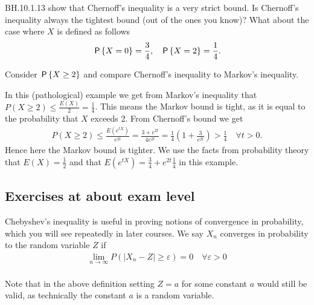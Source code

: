 \documentclass[assignments]{subfiles}
\begin{document}
\begin{exercise}
BH.10.1.13 show that Chernoff's inequality is a very strict bound.
Is Chernoff's inequality always the tightest bound (out of the ones you know)?
What about the case where $X$ is defined as follows
\begin{align*}
    &\P{X=0} = \frac{3}{4}, & \P{X=2} = \frac{1}{4}.
\end{align*}

\begin{hint}
  Consider $\P{X\geq2}$ and compare Chernoff's inequality to Markov's inequality.
\end{hint}

\begin{solution}
In this (pathological) example we get from Markov's inequality that $P(X\geq 2) \leq \frac{E(X)}{2}=\frac{1}{4}$. This means the Markov bound is tight, as it is equal to the probability that $X$ exceeds 2. From Chernoff's bound we get
\begin{align*}
    P(X\geq 2)\leq \frac{E(e^{t  X})}{e^{2t}} = \frac{3+e^{2t}}{4 e^{2t}} = \frac{1}{4}\left(1+\frac{3}{e^{2t}}\right) > \frac{1}{4}\quad\forall t>0.
\end{align*} Hence here the Markov bound is tighter. We use the facts from probability theory that $E(X)=\frac12$ and that $E(e^{t X})=\frac34+e^{2 t}\frac14$ in this example.
\end{solution}
\end{exercise}



\subsection{Exercises at about exam level}
\label{sec:exercises-at-about-1}

Chebyshev's inequality is useful in proving notions of convergence in probability, which you will see repeatedly in later courses. We say $X_n$ converges in probability to the random variable $Z$ if
\begin{align*}
    \lim_{n\rightarrow\infty}P(\left|X_n-Z\right| \geq \varepsilon) = 0\quad\forall\varepsilon>0
\end{align*}\\
Note that in the above definition setting $Z=a$ for some constant $a$ would still be valid, as technically the constant $a$ is a random variable.
\end{document}
